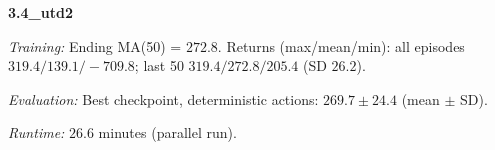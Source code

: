 \noindent\textbf{3.4_utd2}\par
\emph{Training:} Ending MA(50) = $272.8$. Returns (max/mean/min): all episodes $319.4/139.1/-709.8$; last 50 $319.4/272.8/205.4$ (SD $26.2$).\par
\emph{Evaluation:} Best checkpoint, deterministic actions: $269.7\pm 24.4$ (mean $\pm$ SD).\par
\emph{Runtime:} $26.6$ minutes (parallel run).\par
